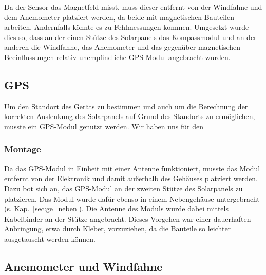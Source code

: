 Da der Sensor das Magnetfeld misst, muss dieser entfernt von der Windfahne und dem Anemometer platziert werden, da beide mit magnetischen Bauteilen arbeiten. Andernfalls könnte es zu Fehlmessungen kommen. Umgesetzt wurde dies so, dass an der einen Stütze des Solarpanels das Kompassmodul und an der anderen die Windfahne, das Anemometer und das gegenüber magnetischen Beeinflussungen relativ unempfindliche GPS-Modul angebracht wurden.



\subsection{GPS} %

Um den Standort des Geräts zu bestimmen und auch um die Berechnung der korrekten Auslenkung des Solarpanels auf Grund des Standorts zu ermöglichen, musste ein GPS-Modul genutzt werden. Wir haben uns für den %

\subsubsection{Montage}

Da das GPS-Modul in Einheit mit einer Antenne funktioniert, musste das Modul entfernt von der Elektronik und damit außerhalb des Gehäuses platziert werden. Dazu bot sich an, das GPS-Modul an der zweiten Stütze des Solarpanels zu platzieren. Das Modul wurde dafür ebenso in einem Nebengehäuse untergebracht (s. Kap.~\ref{sec:ge_neben}). Die Antenne des Moduls wurde dabei mittels Kabelbinder an der Stütze angebracht. Dieses Vorgehen war einer dauerhaften Anbringung, etwa durch Kleber, vorzuziehen, da die Bauteile so leichter ausgetauscht werden können.


\subsection{Anemometer und Windfahne}

